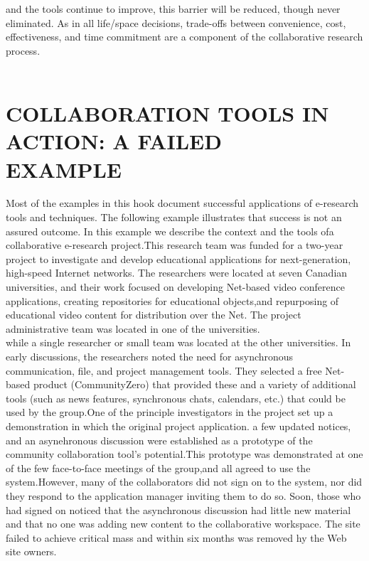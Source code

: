 \documentclass[a4paper,12pt]{article}
\begin{document}
	and the tools continue to improve, this barrier will be reduced, though never eliminated. As in all life/space decisions, trade-offs between convenience, cost, effectiveness, and time commitment are a component of the collaborative research process.\\
	\\
	\section{COLLABORATION TOOLS IN ACTION: A FAILED\\ EXAMPLE}
	Most of the examples in this hook document successful applications of e-research tools and techniques. The following example illustrates that success is not an assured outcome. In this example we describe the context and the tools ofa collaborative e-research project.This research team was funded for a two-year project to investigate and develop educational applications for next-generation, high-speed Internet networks. The researchers were located at seven Canadian universities, and their work focused on developing Net-based video conference applications, creating repositories for educational objects,and repurposing of educational video content for distribution over the Net. The project administrative team was located in one of the universities.\\
	while a single researcher or small team was located at the other universities. In early discussions, the researchers noted the need for asynchronous communication, file, and project management tools. They selected a free Net-based product (CommunityZero) that provided these and a variety of additional tools (such as news features, synchronous chats, calendars, etc.) that could be used by the group.One of the principle investigators in the project set up a demonstration in which the original project application. a few updated notices, and an asynehronous discussion were established as a prototype of the community collaboration tool's potential.This prototype was demonstrated at one of the few face-to-face meetings of the group,and all agreed to use the system.However, many of the collaborators did not sign on to the system, nor did they respond to the application manager inviting them to do so. Soon, those who had signed on noticed that the asynchronous discussion had little new material and that no one was adding new content to the collaborative workspace. The site failed to achieve critical mass and within six months was removed hy the Web site owners.\\
\end{document}
